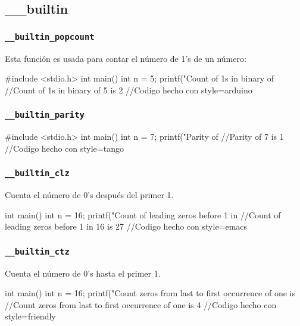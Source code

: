 \documentclass[a4paper,11pt]{article}
\begin{document}
\subsection*{\_\_builtin}
\subsubsection*{\texttt{\_\_builtin\_popcount}}
Esta función es usada para contar el número de 1's de un número:
\begin{pyglist}[language=c++,caption={popcount},listingname={\textbf{Ejemplo}},style=arduino]
#include <stdio.h> 
int main() { 
    int n = 5; 
    printf("Count of 1s in binary of %
    //Count of 1s in binary of 5 is 2
}
//Codigo hecho con style=arduino
\end{pyglist}
\subsubsection*{\texttt{\_\_builtin\_parity}}
\begin{pyglist}[language=c++,caption={popcount},listingname={\textbf{Ejemplo}},style=tango]
#include <stdio.h> 
int main() { 
    int n = 7; 
    printf("Parity of %
    //Parity of 7 is 1
}
//Codigo hecho con style=tango 
\end{pyglist}
\subsubsection*{\texttt{\_\_builtin\_clz}}
Cuenta el número de 0's después del primer 1.
\begin{pyglist}[language=c++,caption={popcount},listingname={\textbf{Ejemplo}},style=emacs]
int main() { 
    int n = 16; 
    printf("Count of leading zeros before 1 in %
    //Count of leading zeros before 1 in 16 is 27
}
//Codigo hecho con style=emacs
\end{pyglist}
\subsubsection*{\texttt{\_\_builtin\_ctz}}
Cuenta el número de 0's hasta el primer 1.
\begin{pyglist}[language=c++,caption={popcount},listingname={\textbf{Ejemplo}},style=friendly]
int main() { 
    int n = 16; 
    printf("Count zeros from last to first occurrence of one is %
    //Count zeros from last to first occurrence of one is 4
} 
//Codigo hecho con style=friendly
\end{pyglist}
\end{document}
